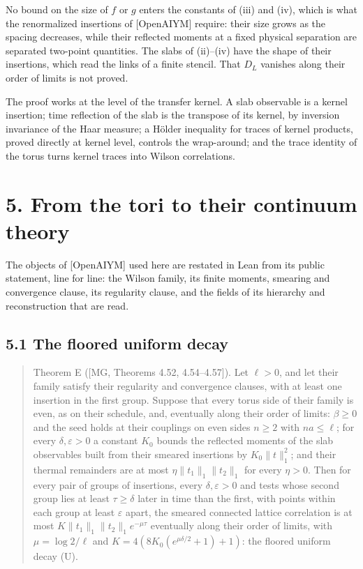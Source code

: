 \documentclass[10pt,letterpaper,twocolumn]{article}
\begin{document}
No bound on the size of \(f\) or \(g\) enters the constants of (iii) and (iv), which is what the renormalized insertions of {[}OpenAIYM{]} require: their size grows as the spacing decreases, while their reflected moments at a fixed physical separation are separated two-point quantities. The slabs of (ii)--(iv) have the shape of their insertions, which read the links of a finite stencil. That \(D_L\) vanishes along their order of limits is not proved.

The proof works at the level of the transfer kernel. A slab observable is a kernel insertion; time reflection of the slab is the transpose of its kernel, by inversion invariance of the Haar measure; a Hölder inequality for traces of kernel products, proved directly at kernel level, controls the wrap-around; and the trace identity of the torus turns kernel traces into Wilson correlations.

\section{5. From the tori to their continuum theory}\label{5-from-the-tori-to-their-continuum-theory}

The objects of {[}OpenAIYM{]} used here are restated in Lean from its public statement, line for line: the Wilson family, its finite moments, smearing and convergence clause, its regularity clause, and the fields of its hierarchy and reconstruction that are read.

\subsection{5.1 The floored uniform decay}\label{51-the-floored-uniform-decay}

\begin{quote}
Theorem E ({[}MG, Theorems 4.52, 4.54--4.57{]}). Let \(\ell>0\), and let their family satisfy their regularity and convergence clauses, with at least one insertion in the first group. Suppose that every torus side of their family is even, as on their schedule, and, eventually along their order of limits: \(\beta\ge0\) and the seed holds at their couplings on even sides \(n\ge2\) with \(na\le\ell\); for every \(\delta,\varepsilon>0\) a constant \(K_0\) bounds the reflected moments of the slab observables built from their smeared insertions by \(K_0\lVert t\rVert_1^2\); and their thermal remainders are at most \(\eta\lVert t_1\rVert_1\lVert t_2\rVert_1\) for every \(\eta>0\). Then for every pair of groups of insertions, every \(\delta,\varepsilon>0\) and tests whose second group lies at least \(\tau\ge\delta\) later in time than the first, with points within each group at least \(\varepsilon\) apart, the smeared connected lattice correlation is at most \(K\lVert t_1\rVert_1\lVert t_2\rVert_1e^{-\mu\tau}\) eventually along their order of limits, with \(\mu=\log2/\ell\) and \(K=4(8K_0(e^{\mu\delta/2}+1)+1)\): the floored uniform decay (U).
\end{quote}
\end{document}
